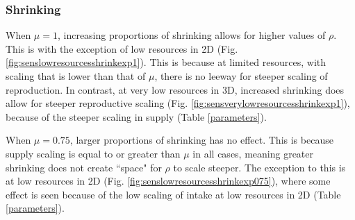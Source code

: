 \documentclass[a4paper, 11pt, hidelinks]{article} %
\begin{document}
	\subsubsection{Shrinking}
	When $ \mu = 1$, increasing proportions of shrinking allows for higher values of $ \rho $.  This is with the exception of low resources in 2D (Fig. \ref{fig:senslowresourcesshrinkexp1}).  This is because at limited resources, with scaling that is lower than that of $ \mu $, there is no leeway for steeper scaling of reproduction.  In contrast, at very low resources in 3D, increased shrinking does allow for steeper reproductive scaling (Fig. \ref{fig:sensverylowresourcesshrinkexp1}), because of the steeper scaling in supply (Table \ref{parameters}).
	
	When $ \mu = 0.75 $, larger proportions of shrinking has no effect.  This is because supply scaling is equal to or greater than $ \mu $ in all cases, meaning greater shrinking does not create ``space" for $ \rho $ to scale steeper.  The exception to this is at low resources in 2D (Fig. \ref{fig:senslowresourcesshrinkexp075}), where some effect is seen because of the low scaling of intake at low resources in 2D (Table \ref{parameters}).

	
\end{document}
